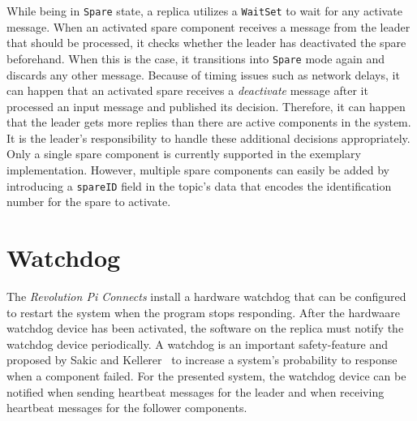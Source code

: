 While being in \texttt{Spare} state, a replica utilizes a \texttt{WaitSet} to wait for any activate message.
When an activated spare component receives a message from the leader that should be processed, it checks whether the leader has deactivated the spare beforehand.
When this is the case, it transitions into \texttt{Spare} mode again and discards any other message.
Because of timing issues such as network delays, it can happen that an activated spare receives a \textit{deactivate} message after it processed an input message and published its decision.
Therefore, it can happen that the leader gets more replies than there are active components in the system.
It is the leader's responsibility to handle these additional decisions appropriately.
\\

Only a single spare component is currently supported in the exemplary implementation.
However, multiple spare components can easily be added by introducing a \texttt{spareID} field in the topic's data that encodes the identification number for the spare to activate.

\section{Watchdog}
The \textit{Revolution Pi Connects} install a hardware watchdog that can be configured to restart the system when the program stops responding.
After the hardwaare watchdog device has been activated, the software on the replica must notify the watchdog device periodically.
A watchdog is an important safety-feature and proposed by Sakic and Kellerer~\cite{SakicTimeInConsensus} to increase a system's probability to response when a component failed.
For the presented system, the watchdog device can be notified when sending heartbeat messages for the leader and when receiving heartbeat messages for the follower components.

